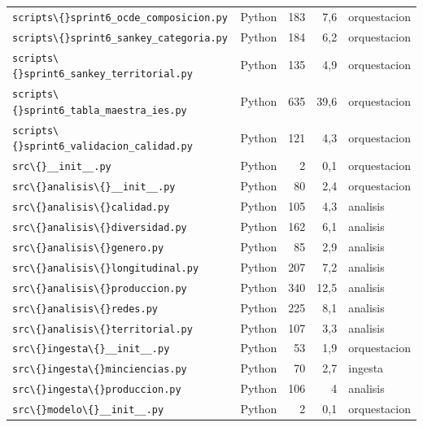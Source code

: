 \begin{longtable}{>{\raggedright\arraybackslash}p{6.2cm} l rr >{\raggedright\arraybackslash}p{3.0cm}}
    \texttt{scripts\textbackslash\{\}sprint6\_ocde\_composicion.py} & Python & 183 & 7,6 & orquestacion \\
    \texttt{scripts\textbackslash\{\}sprint6\_sankey\_categoria.py} & Python & 184 & 6,2 & orquestacion \\
    \texttt{scripts\textbackslash\{\}sprint6\_sankey\_territorial.py} & Python & 135 & 4,9 & orquestacion \\
    \texttt{scripts\textbackslash\{\}sprint6\_tabla\_maestra\_ies.py} & Python & 635 & 39,6 & orquestacion \\
    \texttt{scripts\textbackslash\{\}sprint6\_validacion\_calidad.py} & Python & 121 & 4,3 & orquestacion \\
    \texttt{src\textbackslash\{\}\_\_init\_\_.py} & Python & 2 & 0,1 & orquestacion \\
    \texttt{src\textbackslash\{\}analisis\textbackslash\{\}\_\_init\_\_.py} & Python & 80 & 2,4 & orquestacion \\
    \texttt{src\textbackslash\{\}analisis\textbackslash\{\}calidad.py} & Python & 105 & 4,3 & analisis \\
    \texttt{src\textbackslash\{\}analisis\textbackslash\{\}diversidad.py} & Python & 162 & 6,1 & analisis \\
    \texttt{src\textbackslash\{\}analisis\textbackslash\{\}genero.py} & Python & 85 & 2,9 & analisis \\
    \texttt{src\textbackslash\{\}analisis\textbackslash\{\}longitudinal.py} & Python & 207 & 7,2 & analisis \\
    \texttt{src\textbackslash\{\}analisis\textbackslash\{\}produccion.py} & Python & 340 & 12,5 & analisis \\
    \texttt{src\textbackslash\{\}analisis\textbackslash\{\}redes.py} & Python & 225 & 8,1 & analisis \\
    \texttt{src\textbackslash\{\}analisis\textbackslash\{\}territorial.py} & Python & 107 & 3,3 & analisis \\
    \texttt{src\textbackslash\{\}ingesta\textbackslash\{\}\_\_init\_\_.py} & Python & 53 & 1,9 & orquestacion \\
    \texttt{src\textbackslash\{\}ingesta\textbackslash\{\}minciencias.py} & Python & 70 & 2,7 & ingesta \\
    \texttt{src\textbackslash\{\}ingesta\textbackslash\{\}produccion.py} & Python & 106 & 4 & analisis \\
    \texttt{src\textbackslash\{\}modelo\textbackslash\{\}\_\_init\_\_.py} & Python & 2 & 0,1 & orquestacion \\

\end{longtable}
